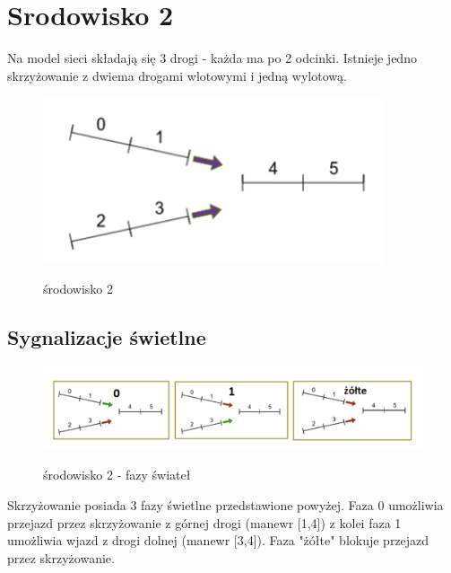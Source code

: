 \documentclass[12pt]{book}
\theoremstyle{plain}
\begin{document}
\section{Srodowisko 2}
Na model sieci składają się 3 drogi - każda ma po 2 odcinki. Istnieje jedno skrzyżowanie z dwiema drogami wlotowymi i jedną wylotową.
	\begin{figure}[H]
	\centering
	\includegraphics[width=10cm]{images/env_14}
	\label{fig:env_14}
	\caption{środowisko 2}
\end{figure}

\subsection{Sygnalizacje świetlne}	
\begin{figure}[H]
	\centering
	\includegraphics[width=17cm]{images/env_14_fazy}
	\label{fig:env_14_fazy}
	\caption{środowisko 2 - fazy świateł}
\end{figure}\noindent
Skrzyżowanie posiada 3 fazy świetlne przedstawione powyżej. Faza 0 umożliwia przejazd przez skrzyżowanie z górnej drogi (manewr [1,4]) z kolei faza 1 umożliwia wjazd z drogi dolnej (manewr [3,4]). Faza "żółte" blokuje przejazd przez skrzyżowanie.
\end{document}
